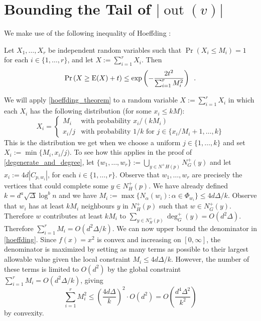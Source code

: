 \documentclass{patmorin}
\DeclareMathOperator{\outn}{out}
\begin{document}





\appendix

\section{Bounding the Tail of \texorpdfstring{\boldmath$|\outn(v)|$}{out(v)}}

We make use of the following inequality of Hoeffding \cite[??]{boucheron.lugosi.ea:concentration}:

\begin{thm}\label{hoeffding_theorem}
  Let $X_1,\ldots,X_r$ be independent random variables such that $\Pr(X_i\le M_i)=1$ for each $i\in\{1,\ldots,r\}$, and let $X:=\sum_{i=1}^r X_i$. Then
  \begin{equation}
    \Pr\left(X \ge \mathrm{E}(X)+ t\right)
      \le \exp\left(-\frac{2t^2}{\sum_{i=1}^r M_i^2}\right) \enspace . \label{hoeffding}
  \end{equation}
\end{thm}
We will apply \cref{hoeffding_theorem} to a random variable $X:=\sum_{i=1}^r X_i$ in which each $X_i$ has the following distribution (for some $x_i\le kM$):
\[
  X_i = \begin{cases}
          M_i & \text{with probability $x_i/(kM_i)$} \\
          x_i/j & \text{with probability $1/k$ for $j\in\{x_i/M_i+1,\ldots,k\}$}
        \end{cases}
\]
This is the distribution we get when we choose a uniform $j\in\{1,\ldots,k\}$ and set $X_i:=\min\{M_i,x_i/j)$.  To see how this applies in the proof of \cref{degenerate_and_degree}, let $\{w_1,\ldots,w_r\}:=\bigcup_{y\in N^+H(p)} N^+_G(y)$ and let $x_i:=4d|C_{p,w_i}|$, for each $i\in\{1,\ldots,r\}$.
Observe that $w_1,\ldots,w_r$ are precisely the vertices that could complete some $y\in N^+_H(p)$.  We have already defined $k=d^a\sqrt{\Delta}\log^{b} n$ and we have $M_i:=\max\{N_\alpha(w_i):\alpha \in \Phi_{w_i}\}\le 4d\Delta/k$. Observe that $w_i$ has at least $kM_i$ neighbours $y$ in $N^+_H(p)$ such that $w\in N^+_G(y)$.  Therefore $w$ contributes at least $kM_i$ to $\sum_{y\in N^+_H(p)}\deg^+_G(y)= O(d^2\Delta)$.  Therefore $\sum_{i=1}^r M_i = O(d^2\Delta/k)$.  We can now upper bound the denominator in \cref{hoeffding}.  Since $f(x)=x^2$ is convex and increasing on $[0,\infty]$, the denominator is maximized by setting as many terms as possible to their largest allowable value given the local constraint $M_i \le 4d\Delta/k$.  However, the number of these terms is limited to $O(d^2)$ by the global constraint $\sum_{i=1}^r M_i= O(d^2\Delta/k)$, giving
\[
    \sum_{i=1}^r M_i^2 \le \left(\frac{4d\Delta}{k}\right)^2\cdot O(d^2) = O\left(\frac{d^4\Delta^2}{k^2}\right)
\]
by convexity.
\end{document}
